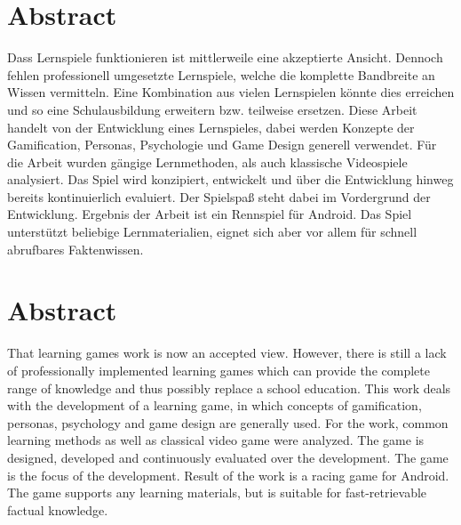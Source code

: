 \section*{Abstract}
Dass Lernspiele funktionieren ist mittlerweile eine akzeptierte Ansicht. Dennoch fehlen professionell umgesetzte Lernspiele, welche die komplette Bandbreite an Wissen vermitteln. Eine Kombination aus vielen Lernspielen könnte dies erreichen und so eine Schulausbildung erweitern bzw. teilweise ersetzen.
Diese Arbeit handelt von der Entwicklung eines Lernspieles, dabei werden Konzepte der Gamification, Personas, Psychologie und Game Design generell verwendet. Für die Arbeit wurden gängige Lernmethoden, als auch klassische Videospiele analysiert. Das Spiel wird konzipiert, entwickelt und über die Entwicklung hinweg bereits kontinuierlich evaluiert. Der Spielspaß steht dabei im Vordergrund der Entwicklung.
Ergebnis der Arbeit ist ein Rennspiel für Android. Das Spiel unterstützt beliebige Lernmaterialien, eignet sich aber vor allem für schnell abrufbares Faktenwissen.

\vfill

\section*{Abstract}
That learning games work is now an accepted view. However, there is still a lack of professionally implemented learning games which can provide the complete range of knowledge and thus possibly replace a school education.
This work deals with the development of a learning game, in which concepts of gamification, personas, psychology and game design are generally used. For the work, common learning methods as well as classical video game were analyzed. The game is designed, developed and continuously evaluated over the development. The game is the focus of the development.
Result of the work is a racing game for Android. The game supports any learning materials, but is suitable for fast-retrievable factual knowledge.

\vfill\vfill\newpage

